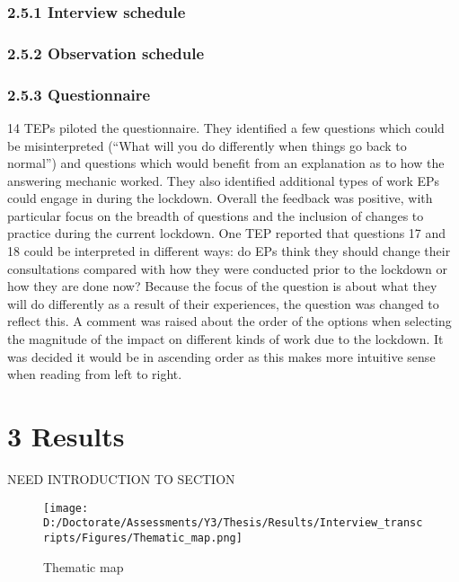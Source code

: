 \documentclass[
  english,
  man]{apa}
\begin{document}
\hypertarget{interview-schedule}{%
\subsubsection{2.5.1 Interview schedule}\label{interview-schedule}}

\hypertarget{observation-schedule}{%
\subsubsection{2.5.2 Observation schedule}\label{observation-schedule}}

\hypertarget{questionnaire-2}{%
\subsubsection{2.5.3 Questionnaire}\label{questionnaire-2}}

14 TEPs piloted the questionnaire. They identified a few questions which could be misinterpreted (``What will you do differently when things go back to normal'') and questions which would benefit from an explanation as to how the answering mechanic worked. They also identified additional types of work EPs could engage in during the lockdown. Overall the feedback was positive, with particular focus on the breadth of questions and the inclusion of changes to practice during the current lockdown. One TEP reported that questions 17 and 18 could be interpreted in different ways: do EPs think they should change their consultations compared with how they were conducted prior to the lockdown or how they are done now? Because the focus of the question is about what they will do differently as a result of their experiences, the question was changed to reflect this. A comment was raised about the order of the options when selecting the magnitude of the impact on different kinds of work due to the lockdown. It was decided it would be in ascending order as this makes more intuitive sense when reading from left to right.

\hypertarget{results}{%
\section{3 Results}\label{results}}

NEED INTRODUCTION TO SECTION

\newpage
\blandscape

\begin{figure}
\centering
\texttt{[image: D:/Doctorate/Assessments/Y3/Thesis/Results/Interview\_transcripts/Figures/Thematic\_map.png]}
\caption{Thematic
map}
\end{figure}
\end{document}
